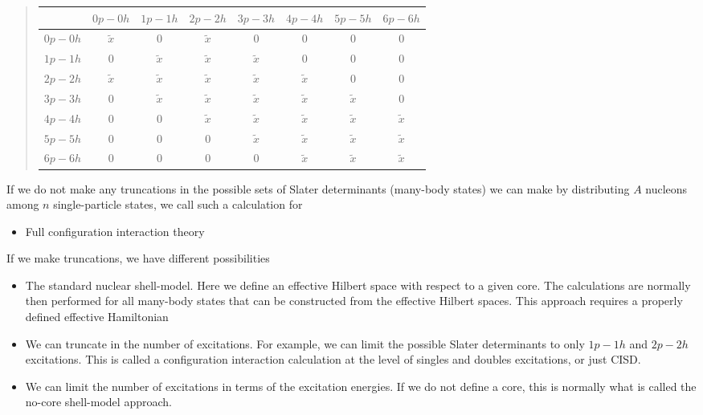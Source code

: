 \documentclass[%
twoside,                 %
final,                   %
10pt]{article}
\begin{document}
\begin{quote}
\begin{tabular}{cccccccc}
\hline
\multicolumn{1}{c}{  } & \multicolumn{1}{c}{ $0p-0h$ } & \multicolumn{1}{c}{ $1p-1h$ } & \multicolumn{1}{c}{ $2p-2h$ } & \multicolumn{1}{c}{ $3p-3h$ } & \multicolumn{1}{c}{ $4p-4h$ } & \multicolumn{1}{c}{ $5p-5h$ } & \multicolumn{1}{c}{ $6p-6h$ } \\
\hline
$0p-0h$ & $\tilde{x}$ & 0           & $\tilde{x}$ & 0           & 0           & 0           & 0           \\
$1p-1h$ & 0           & $\tilde{x}$ & $\tilde{x}$ & $\tilde{x}$ & 0           & 0           & 0           \\
$2p-2h$ & $\tilde{x}$ & $\tilde{x}$ & $\tilde{x}$ & $\tilde{x}$ & $\tilde{x}$ & 0           & 0           \\
$3p-3h$ & 0           & $\tilde{x}$ & $\tilde{x}$ & $\tilde{x}$ & $\tilde{x}$ & $\tilde{x}$ & 0           \\
$4p-4h$ & 0           & 0           & $\tilde{x}$ & $\tilde{x}$ & $\tilde{x}$ & $\tilde{x}$ & $\tilde{x}$ \\
$5p-5h$ & 0           & 0           & 0           & $\tilde{x}$ & $\tilde{x}$ & $\tilde{x}$ & $\tilde{x}$ \\
$6p-6h$ & 0           & 0           & 0           & 0           & $\tilde{x}$ & $\tilde{x}$ & $\tilde{x}$ \\
\hline
\end{tabular}
\end{quote}

\noindent
If we do not make any truncations in the possible sets of Slater determinants (many-body states) we can make by distributing $A$ nucleons among $n$ single-particle states, we call such a calculation for 
\begin{itemize}
\item Full configuration interaction theory
\end{itemize}

\noindent
If we make truncations, we have different possibilities

\begin{itemize}
\item The standard nuclear shell-model. Here we define an effective Hilbert space with respect to a given core. The calculations are normally then performed for all many-body states that can be constructed from the effective Hilbert spaces. This approach requires a properly defined effective Hamiltonian

\item We can truncate in the number of excitations. For example, we can limit the possible Slater determinants to only $1p-1h$ and $2p-2h$ excitations. This is called a configuration interaction calculation at the level of singles and doubles excitations, or just CISD. 

\item We can limit the number of excitations in terms of the excitation energies. If we do not define a core, this is normally what is called the no-core shell-model approach. 
\end{itemize}
\end{document}
